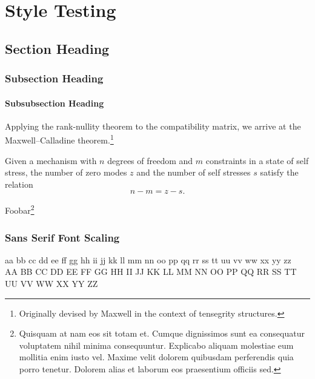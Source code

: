 
\chapter{Style Testing}

\section{Section Heading}

\subsection{Subsection Heading}

\subsubsection{Subsubsection Heading}

\setcounter{footnote}{43}

Applying the rank-nullity theorem to the compatibility matrix, we arrive at the Maxwell--Calladine theorem.\footnote{Originally devised by Maxwell in the context of tensegrity structures.}
%
\begin{theorem}
  Given a mechanism with $n$ degrees of freedom and $m$ constraints in a state of self stress, the number of zero modes $z$ and the number of self stresses $s$ satisfy the relation
  \begin{equation*}
    n - m = z - s.
  \end{equation*}
\end{theorem}

\setcounter{footnote}{8}

Foobar\footnote{%
Quisquam at nam eos sit totam et. Cumque dignissimos sunt ea consequatur voluptatem nihil minima consequuntur. Explicabo aliquam molestiae eum mollitia enim iusto vel. Maxime velit dolorem quibusdam perferendis quia porro tenetur. Dolorem alias et laborum eos praesentium officiis sed.}

\subsection{Sans Serif Font Scaling}

\textsf{a}a
\textsf{b}b
\textsf{c}c
\textsf{d}d
\textsf{e}e
\textsf{f}f
\textsf{g}g
\textsf{h}h
\textsf{i}i
\textsf{j}j
\textsf{k}k
\textsf{l}l
\textsf{m}m
\textsf{n}n
\textsf{o}o
\textsf{p}p
\textsf{q}q
\textsf{r}r
\textsf{s}s
\textsf{t}t
\textsf{u}u
\textsf{v}v
\textsf{w}w
\textsf{x}x
\textsf{y}y
\textsf{z}z\\
\textsf{A}A
\textsf{B}B
\textsf{C}C
\textsf{D}D
\textsf{E}E
\textsf{F}F
\textsf{G}G
\textsf{H}H
\textsf{I}I
\textsf{J}J
\textsf{K}K
\textsf{L}L
\textsf{M}M
\textsf{N}N
\textsf{O}O
\textsf{P}P
\textsf{Q}Q
\textsf{R}R
\textsf{S}S
\textsf{T}T
\textsf{U}U
\textsf{V}V
\textsf{W}W
\textsf{X}X
\textsf{Y}Y
\textsf{Z}Z

